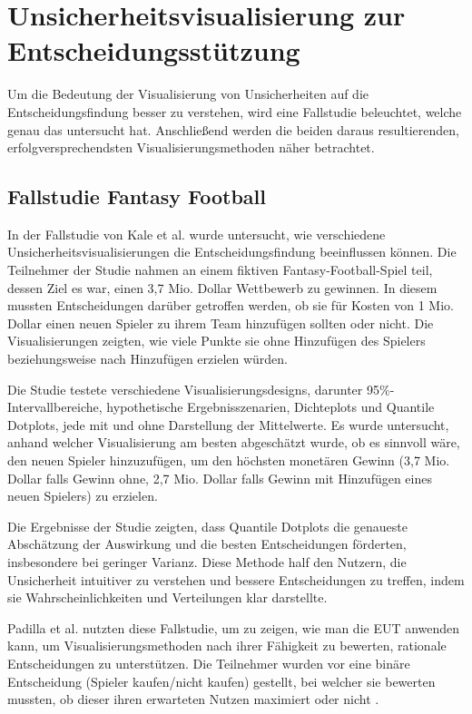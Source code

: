\section{Unsicherheitsvisualisierung zur Entscheidungsstützung}

Um die Bedeutung der Visualisierung von Unsicherheiten auf die Entscheidungsfindung besser zu verstehen, wird eine Fallstudie beleuchtet, welche genau das untersucht hat. Anschließend werden die beiden daraus resultierenden, erfolgversprechendsten Visualisierungsmethoden näher betrachtet.

\subsection{Fallstudie Fantasy Football}

In der Fallstudie von Kale et al. \cite{Kale2021} wurde untersucht, wie verschiedene Unsicherheitsvisualisierungen die Entscheidungsfindung beeinflussen können. Die Teilnehmer der Studie nahmen an einem fiktiven Fantasy-Football-Spiel teil, dessen Ziel es war, einen 3,7 Mio. Dollar Wettbewerb zu gewinnen. In diesem mussten Entscheidungen darüber getroffen werden, ob sie für Kosten von 1 Mio. Dollar einen neuen Spieler zu ihrem Team hinzufügen sollten oder nicht. Die Visualisierungen zeigten, wie viele Punkte sie ohne Hinzufügen des Spielers beziehungsweise nach Hinzufügen erzielen würden. 

Die Studie testete verschiedene Visualisierungsdesigns, darunter 95\%-Intervallbereiche, hypothetische Ergebnisszenarien, Dichteplots und Quantile Dotplots, jede mit und ohne Darstellung der Mittelwerte. Es wurde untersucht, anhand welcher Visualisierung am besten abgeschätzt wurde, ob es sinnvoll wäre, den neuen Spieler hinzuzufügen, um den höchsten monetären Gewinn (3,7 Mio. Dollar falls Gewinn ohne, 2,7 Mio. Dollar falls Gewinn mit Hinzufügen eines neuen Spielers) zu erzielen.

Die Ergebnisse der Studie zeigten, dass Quantile Dotplots die genaueste Abschätzung der Auswirkung und die besten Entscheidungen förderten, insbesondere bei geringer Varianz. Diese Methode half den Nutzern, die Unsicherheit intuitiver zu verstehen und bessere Entscheidungen zu treffen, indem sie Wahrscheinlichkeiten und Verteilungen klar darstellte.

Padilla et al. nutzten diese Fallstudie, um zu zeigen, wie man die EUT anwenden kann, um Visualisierungsmethoden nach ihrer Fähigkeit zu bewerten, rationale Entscheidungen zu unterstützen. Die Teilnehmer wurden vor eine binäre Entscheidung (Spieler kaufen/nicht kaufen) gestellt, bei welcher sie bewerten mussten, ob dieser ihren erwarteten Nutzen maximiert oder nicht \cite{VisualizationPsychology2023}.

